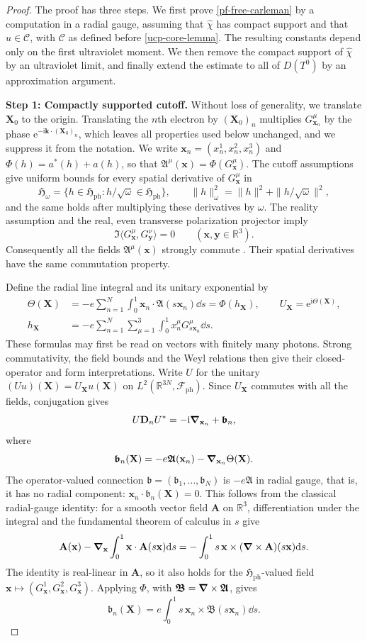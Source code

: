 \documentclass[final,reqno]{amsart}
\theoremstyle{remark}
\newcommand{\RR}{\mathbb{R}}
\renewcommand{\i}{\mathrm{i}}
\newcommand{\e}{\mathrm{e}}
\newcommand{\dua}[2]{\langle #1, #2 \rangle}
\newcommand{\DC}{D}
\newcommand{\AF}{\bm{\mathfrak{A}}}
\newcommand{\BF}{\bm{\mathfrak{B}}}
\newcommand{\Af}{\mathfrak{A}}
\newcommand{\vbf}{\bm{\mathfrak{b}}}
\newcommand{\ph}{\mathrm{ph}}
\newcommand{\Fock}{\mathcal{F}}
\newcommand{\Hil}{\mathfrak{H}}
\newcommand{\vy}{\mathbf{y}}
\newcommand{\vk}{\mathbf{k}}
\newcommand{\vx}{\mathbf{x}}
\newcommand{\vA}{{\mathbf{A}}}
\newcommand{\vX}{{\mathbf{X}}}
\newcommand{\vD}{{\mathbf{D}}}
\newcommand{\wh}[1]{\widehat{#1}}
\begin{document}
\begin{proof}
The proof has three steps.  We first prove \cref{pf-free-carleman} by
a computation in a radial gauge, assuming that $\wh\chi$ has compact
support and that $u\in\mathcal C$, with $\mathcal C$ as defined before
\cref{ucp-core-lemma}.  The resulting constants depend only on the first ultraviolet
moment.  We then remove the compact support of $\wh\chi$ by an
ultraviolet limit, and finally extend the estimate to all of
$\DC(T^0)$ by an approximation argument.

\noindent\textbf{Step 1: Compactly supported cutoff.}
Without loss of generality, we translate $\vX_0$ to the origin.
Translating the $n$th electron by $(\vX_0)_n$ multiplies
$G^\mu_{\vx_n}$ by the phase $\e^{-\i\vk\cdot(\vX_0)_n}$, which leaves
all properties used below unchanged, and we suppress it from the
notation.  We write $\vx_n=(x_n^1,x_n^2,x_n^3)$ and
$\varPhi(h)=a^*(h)+a(h)$, so that $\Af^\mu(\vx)=\varPhi(G^\mu_\vx)$.
The cutoff assumptions give uniform bounds for every spatial
derivative of $G^\mu_\vx$ in
\[
 \Hil_\omega
 =\{h\in\Hil_\ph:h/\sqrt\omega\in\Hil_\ph\},
 \qquad
 \|h\|_\omega^2=\|h\|^2+\|h/\sqrt\omega\|^2,
\]
and the same holds after multiplying these derivatives by $\omega$.
The reality assumption and the real, even transverse polarization
projector imply
\[
 \Im\dua{G^\mu_\vx}{G^\nu_\vy}=0
 \qquad(\vx,\vy\in\RR^3).
\]
Consequently all the fields $\Af^\mu(\vx)$ strongly commute
\cite[Proposition~A.6(iii)]{Q}.
Their spatial derivatives have the same commutation property.

Define the radial line integral and its unitary exponential by
\begin{align*}
 \Theta(\vX)&=-e\sum_{n=1}^N\int_0^1\vx_n\cdot\AF(s\vx_n)\dd s
            =\varPhi(h_\vX),
 \qquad U_\vX=\e^{\i\Theta(\vX)},\\
 h_\vX&=-e\sum_{n=1}^N\sum_{\mu=1}^3\int_0^1x_n^\mu G^\mu_{s\vx_n}\dd s.
\end{align*}
These formulas may first be read on vectors with finitely many photons.
Strong commutativity, the field bounds and the Weyl relations then
give their closed-operator and form interpretations.
Write $U$ for the unitary $(Uu)(\vX)=U_\vX u(\vX)$ on
$L^2(\RR^{3N},\Fock_\ph)$.  Since $U_\vX$ commutes with all the fields,
conjugation gives
\[
 U\vD_nU^*=-\i\grad_{\vx_n}+\vbf_n,
\]
where
\[
 \vbf_n(\vX)=-e\AF(\vx_n)-\grad_{\vx_n}\Theta(\vX).
\]
The operator-valued connection $\vbf=(\vbf_1,\ldots,\vbf_N)$ is
$-e\AF$ in radial gauge, that is, it has no radial component:
$\vx_n\cdot\vbf_n(\vX)=0$.  This follows from the classical
radial-gauge identity: for a smooth vector field $\vA$ on $\RR^3$,
differentiation under the integral and the fundamental theorem of
calculus in $s$ give
\[
 \vA(\vx)-\grad_\vx\int_0^1\vx\cdot\vA(s\vx)\dd s
 =-\int_0^1s\,\vx\times(\grad\times\vA)(s\vx)\dd s.
\]
The identity is real-linear in $\vA$, so it also holds for the
$\Hil_\ph$-valued field $\vx\mapsto(G^1_\vx,G^2_\vx,G^3_\vx)$.
Applying $\varPhi$, with $\BF=\grad\times\AF$, gives
\[
 \vbf_n(\vX)=e\int_0^1s\,\vx_n\times\BF(s\vx_n)\dd s.
\]


\end{proof}
\end{document}
